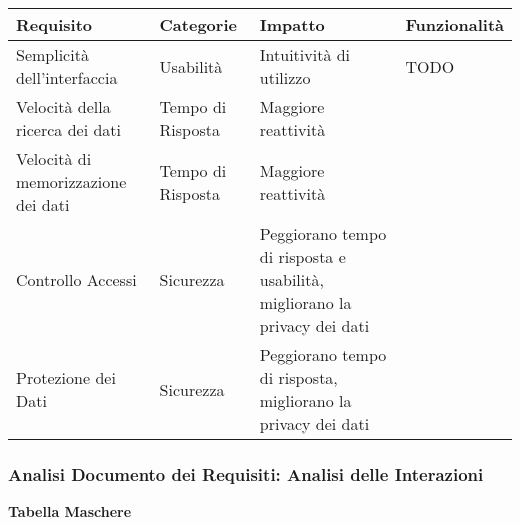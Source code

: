 \begin{tabular} {|P{4cm}|P{2.5cm}|P{3.5cm}|P{4.9cm}|}
    \hline
    \textbf{Requisito}                  & \textbf{Categorie} & \textbf{Impatto}                                                         & \textbf{Funzionalità} \\
    \hline
    Semplicità dell'interfaccia         & Usabilità          & Intuitività di utilizzo                                                  & TODO                  \\
    \hline
    Velocità della ricerca dei dati     & Tempo di Risposta  & Maggiore reattività                                                      &                       \\
    \hline
    Velocità di memorizzazione dei dati & Tempo di Risposta  & Maggiore reattività                                                      &                       \\
    \hline
    Controllo Accessi                   & Sicurezza          & Peggiorano tempo di risposta e usabilità, migliorano la privacy dei dati &                       \\
    \hline
    Protezione dei Dati                 & Sicurezza          & Peggiorano tempo di risposta, migliorano la privacy dei dati             &                       \\
    \hline
\end{tabular}

\newpage

\subsubsection{Analisi Documento dei Requisiti: Analisi delle Interazioni}
\hfill \break

\textbf{Tabella Maschere}
\hfill \break

